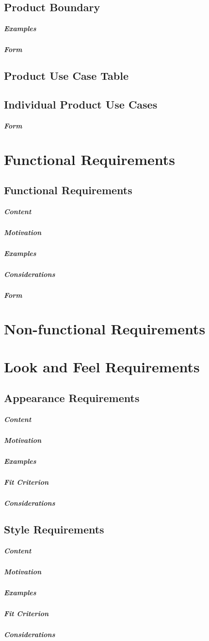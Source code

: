 \documentclass{article}
\begin{document}
\subsection{Product Boundary}
\subparagraph{Examples}
\subparagraph{Form}

\subsection{Product Use Case Table}

\subsection{Individual Product Use Cases}
\subparagraph{Form}

\section{Functional Requirements}

\subsection{Functional Requirements}
\subparagraph{Content}
\subparagraph{Motivation}
\subparagraph{Examples}
\subparagraph{Considerations}
\subparagraph{Form}

\section*{Non-functional Requirements}

\section{Look and Feel Requirements}
\subsection{Appearance Requirements}
\subparagraph{Content}
\subparagraph{Motivation}
\subparagraph{Examples}
\subparagraph{Fit Criterion}
\subparagraph{Considerations}

\subsection{Style Requirements}
\subparagraph{Content}
\subparagraph{Motivation}
\subparagraph{Examples}
\subparagraph{Fit Criterion}
\subparagraph{Considerations}
\end{document}
